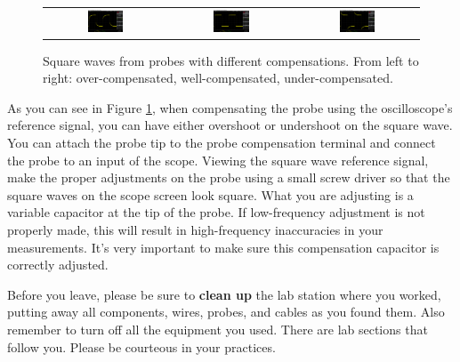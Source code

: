 \documentclass[12pt]{../manual}
\begin{document}
\begin{figure}[ht!]
\begin{center}
\begin{tabular}{ccc}
\includegraphics[width=0.31\textwidth]{figures/overcomp} & \includegraphics[width=0.31\textwidth]{figures/wellcomp} & 
\includegraphics[width=0.31\textwidth]{figures/undercomp}
\end{tabular}
\end{center}
\caption[Square waves from probes with different compensations]{Square waves from probes with different compensations. From left to right: over-compensated, well-compensated, under-compensated.}
\label{fig:oscdifcomp}
\end{figure}

As you can see in Figure \ref{fig:oscdifcomp}, when compensating the probe using the oscilloscope's reference signal, you can have either overshoot or undershoot on the square wave. You can attach the probe tip to the probe compensation terminal and connect the probe to an input of the scope. Viewing the square wave reference signal, make the proper adjustments on the probe using a small screw driver so that the square waves on the scope screen look square. What you are adjusting is a variable capacitor at the tip of the probe. If low-frequency adjustment is not properly made, this will result in high-frequency inaccuracies in your measurements.  It's very important to make sure this compensation capacitor is correctly adjusted.

Before you leave, please be sure to \textbf{clean up} the lab station where you worked, putting away all components, wires, probes, and cables as you found them. Also remember to turn off all the equipment you used. There are lab sections that follow you. Please be courteous in your practices.
\end{document}
